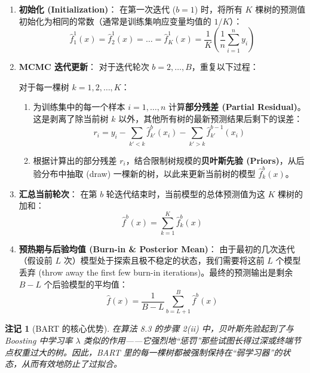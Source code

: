 \documentclass[UTF8]{ctexart}
\newtheorem{remark}{注记}[section]
\numberwithin{equation}{section}
\begin{document}
\begin{enumerate}
    \item \textbf{初始化 (Initialization)}：
    在第一次迭代 ($b=1$) 时，将所有 $K$ 棵树的预测值初始化为相同的常数（通常是训练集响应变量均值的 $1/K$）：
    \begin{equation}
        \hat{f}_1^1(x) = \hat{f}_2^1(x) = \dots = \hat{f}_K^1(x) = \frac{1}{K} \left( \frac{1}{n} \sum_{i=1}^n y_i \right)
    \end{equation}

    \item \textbf{MCMC 迭代更新}：
    对于迭代轮次 $b = 2, \dots, B$，重复以下过程：
    
    对于每一棵树 $k = 1, 2, \dots, K$：
    \begin{enumerate}
        \item[(i)] 为训练集中的每一个样本 $i = 1, \dots, n$ 计算\textbf{部分残差 (Partial Residual)}。这是剥离了除当前树 $k$ 以外，其他所有树的最新预测结果后剩下的误差：
        \begin{equation}
            r_i = y_i - \sum_{k'<k} \hat{f}_{k'}^b(x_i) - \sum_{k'>k} \hat{f}_{k'}^{b-1}(x_i)
        \end{equation}
        \item[(ii)] 根据计算出的部分残差 $r_i$，结合限制树规模的\textbf{贝叶斯先验 (Priors)}，从后验分布中抽取 (draw) 一棵新的树，以此来更新当前树的模型 $\hat{f}_k^b(x)$。
    \end{enumerate}

    \item \textbf{汇总当前轮次}：
    在第 $b$ 轮迭代结束时，当前模型的总体预测值为这 $K$ 棵树的加和：
    \begin{equation}
        \hat{f}^b(x) = \sum_{k=1}^K \hat{f}_k^b(x)
    \end{equation}

    \item \textbf{预热期与后验均值 (Burn-in \& Posterior Mean)}：
    由于最初的几次迭代（假设前 $L$ 次）模型处于探索且极不稳定的状态，我们需要将这前 $L$ 个模型丢弃 (throw away the first few burn-in iterations)。最终的预测输出是剩余 $B - L$ 个后验模型的平均值：
    \begin{equation}
        \hat{f}(x) = \frac{1}{B-L} \sum_{b=L+1}^B \hat{f}^b(x)
    \end{equation}
\end{enumerate}

\begin{remark}[BART 的核心优势]
在算法 8.3 的步骤 2(ii) 中，贝叶斯先验起到了与 Boosting 中学习率 $\lambda$ 类似的作用——它强烈地“惩罚”那些试图长得过深或终端节点权重过大的树。因此，BART 里的每一棵树都被强制保持在“弱学习器”的状态，从而有效地防止了过拟合。
\end{remark}
\end{document}
